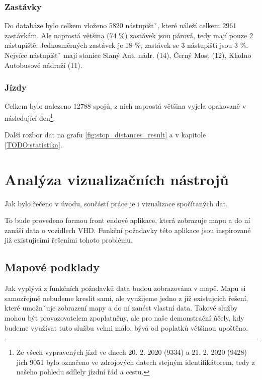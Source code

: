 \subsubsection{Zastávky} \label{subsubsection:zastavky}

Do databáze bylo celkem vloženo 5820 nástupištˇ, které náleží celkem 2961 zastávkám. Ale naprostá většina (74 \%) zastávek jsou párová, tedy mají pouze 2 nástupiště. Jednosměrných zastávek je 18 \%, zastávek se 3 nástupišti jsou 3 \%. Nejvíce nástupištˇ mají stanice Slaný Aut. nádr. (14), Černý Most (12), Kladno Autobusové nádraží (11).

\subsubsection{Jízdy}

Celkem bylo nalezeno 12788 spojů, z nich naprostá většina vyjela opakovaně v následující den\footnote{Ze všech vypravených jízd ve dnech 20. 2. 2020 (9334) a 21. 2. 2020 (9428) jich 9051 bylo označeno ve zdrojových datech stejným identifikátorem, tedy z našeho pohledu sdílely jízdní řád a cestu.}.

Další rozbor dat na grafu \ref{fig:stop_distances_result} a v kapitole \ref{TODO:statistika}.




\section{Analýza vizualizačních nástrojů}

Jak bylo řečeno v úvodu, součástí práce je i vizualizace spočítaných dat.

\bigbreak

To bude provedeno formou front endové aplikace, která zobrazuje mapu a do ní zanáší data o vozidlech VHD. Funkční požadavky této aplikace jsou inspirované již existujícími řešeními tohoto problému.

\subsection{Mapové podklady}

Jak vyplývá z funkčních požadavků data budou zobrazována v mapě. Mapu si samozřejmě nebudeme kreslit sami, ale využijeme jedno z již existujcích řešení, které umožnˇuje zobrazení mapy a do ní zanést vlastní data. Takové služby mohou být provozovatelem zpoplatněny, ale pro naše demonstrační účely, kdy budeme využívat tuto službu velmi málo, bývá od poplatků většinou upoštěno.

